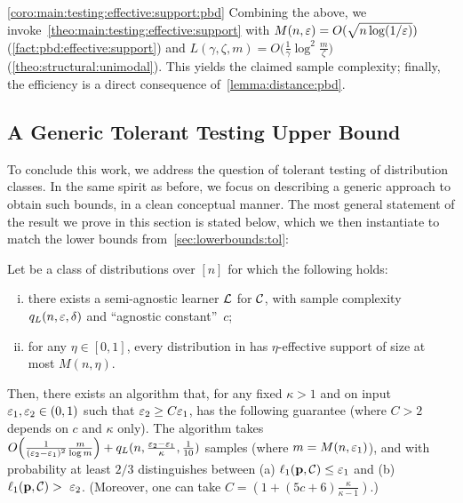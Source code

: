 \begin{proofof}{\cref{coro:main:testing:effective:support:pbd}}
Combining the above, we invoke~\cref{theo:main:testing:effective:support} with $M(n,\eps)=O( \sqrt{n\log(1/\eps)} )$ (\cref{fact:pbd:effective:support}) and $L(\gamma,\zeta,m)=O\big( \frac{1}{\gamma}\log^2 \frac{m}{\zeta} \big)$ (\cref{theo:structural:unimodal}). This yields the claimed sample complexity; finally, the efficiency is a direct consequence of~\cref{lemma:distance:pbd}.
\end{proofof}
 
 
 
\subsection{A Generic Tolerant Testing Upper Bound}\label{sec:toltesting:ub}
To conclude this work, we address the question of tolerant testing of distribution classes. In the same spirit as before, we focus on describing a generic approach to obtain such bounds, in a clean conceptual manner. The most general statement of the result we prove in this section is stated below, which we then instantiate to match the lower bounds from~\cref{sec:lowerbounds:tol}:

\begin{theorem}\label{theo:main:tol:testing:ub:almost}
Let \class be a class of distributions over $[n]$ for which the following holds: 
  \begin{enumerate}[(i)]
    \item there exists a semi-agnostic learner $\Learner$ for $\class$, with sample complexity $q_L(n,\eps, \delta)$ and ``agnostic constant''~$c$;
    \item for any $\eta\in[0,1]$, every distribution in \class has $\eta$-effective support of size at most $M(n,\eta)$.
  \end{enumerate}
Then, there exists an algorithm that, for any fixed $\kappa > 1$ and on input $\eps_1,\eps_2 \in (0,1)$ such that $\eps_2 \geq C \eps_1$, has the following guarantee (where $C > 2$ depends on $c$ and $\kappa$ only). The algorithm takes $\bigO{\frac{1}{(\eps_2-\eps_1)^2}\frac{m}{\log m}} + q_L(n,\frac{\eps_2-\eps_1}{\kappa}, \frac{1}{10})$ samples (where $m=M(n,\eps_1)$), and with probability at least $2/3$ distinguishes between \textsf{(a)} $\lp[1](\D,\class) \leq \eps_1$ and \textsf{(b)} $\lp[1](\D,\class) >~\eps_2$. (Moreover, one can take $C=(1+(5c+6)\frac{\kappa}{\kappa-1})$.)
\end{theorem}

